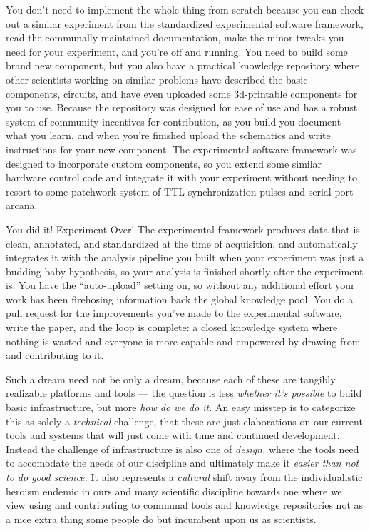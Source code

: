 \documentclass{article}
\begin{document}
You don't need to implement the whole thing from scratch because you can
check out a similar experiment from the standardized experimental
software framework, read the communally maintained documentation, make
the minor tweaks you need for your experiment, and you're off and
running. You need to build some brand new component, but you also have a
practical knowledge repository where other scientists working on similar
problems have described the basic components, circuits, and have even
uploaded some 3d-printable components for you to use. Because the
repository was designed for ease of use and has a robust system of
community incentives for contribution, as you build you document what
you learn, and when you're finished upload the schematics and write
instructions for your new component. The experimental software framework
was designed to incorporate custom components, so you extend some
similar hardware control code and integrate it with your experiment
without needing to resort to some patchwork system of TTL
synchronization pulses and serial port arcana.

You did it! Experiment Over! The experimental framework produces data
that is clean, annotated, and standardized at the time of acquisition,
and automatically integrates it with the analysis pipeline you built
when your experiment was just a budding baby hypothesis, so your
analysis is finished shortly after the experiment is. You have the
``auto-upload'' setting on, so without any additional effort your work
has been firehosing information back the global knowledge pool. You do a
pull request for the improvements you've made to the experimental
software, write the paper, and the loop is complete: a closed knowledge
system where nothing is wasted and everyone is more capable and
empowered by drawing from and contributing to it.

Such a dream need not be only a dream, because each of these are
tangibly realizable platforms and tools --- the question is less
\emph{whether it's possible} to build basic infrastructure, but more
\emph{how do we do it.} An easy misstep is to categorize this as solely
a \emph{technical} challenge, that these are just elaborations on our
current tools and systems that will just come with time and continued
development. Instead the challenge of infrastructure is also one of
\emph{design,} where the tools need to accomodate the needs of our
discipline and ultimately make it \emph{easier than not to do good
science.} It also represents a \emph{cultural} shift away from the
individualistic heroism endemic in ours and many scientific discipline
towards one where we view using and contributing to communal tools and
knowledge repositories not as a nice extra thing some people do but
incumbent upon us as scientists.
\end{document}
